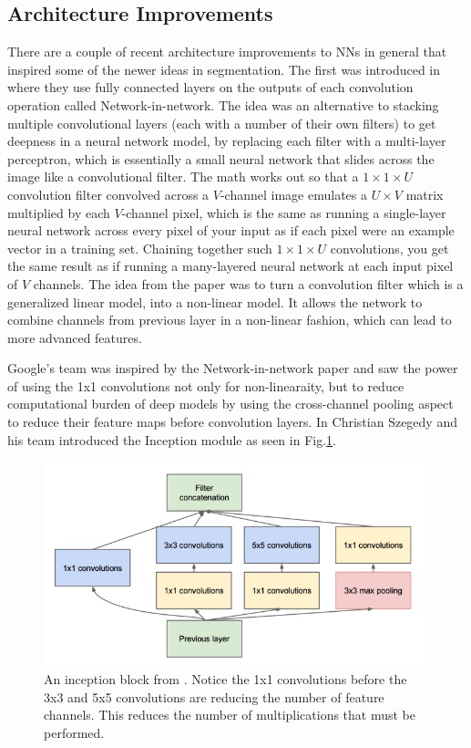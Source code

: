 \subsection{Architecture Improvements}
There are a couple of recent architecture improvements to NNs in general that inspired some of the newer ideas in segmentation. The first was introduced in \cite{lin2013network} where they use fully connected layers on the outputs of each convolution operation called Network-in-network. The idea was an alternative to stacking multiple convolutional layers (each with a number of their own filters) to get deepness in a neural network model, by replacing each filter with a multi-layer perceptron, which is essentially a small neural network that slides across the image like a convolutional filter. The math works out so that a $1\times 1\times U$ convolution filter convolved across a $V$-channel image emulates a $U\times V$ matrix multiplied by each $V$-channel pixel, which is the same as running a single-layer neural network across every pixel of your input as if each pixel were an example vector in a training set. Chaining together such $1\times 1\times U$ convolutions, you get the same result as if running a many-layered neural network at each input pixel of $V$ channels.  The idea from the paper was to turn a convolution filter which is a generalized linear model, into a non-linear model. It allows the network to combine channels from previous layer in a non-linear fashion, which can lead to more advanced features.

Google's team was inspired by the Network-in-network paper and saw the power of using the 1x1 convolutions not only for non-linearaity, but to reduce computational burden of deep models by using the cross-channel pooling aspect to reduce their feature maps before convolution layers. In \cite{szegedy2015going} Christian Szegedy and his team introduced the Inception module as seen in Fig.\ref{f:inceptionblock}. 

\begin{figure}[h!]
	\centering
		\includegraphics[width=1.0\textwidth]{figures/inceptionblock.png}
	\caption{An inception block from \cite{szegedy2015going}. Notice the 1x1 convolutions before the 3x3 and 5x5 convolutions are reducing the number of feature channels. This reduces the number of multiplications that must be performed.}
	\label{f:inceptionblock}
\end{figure}

